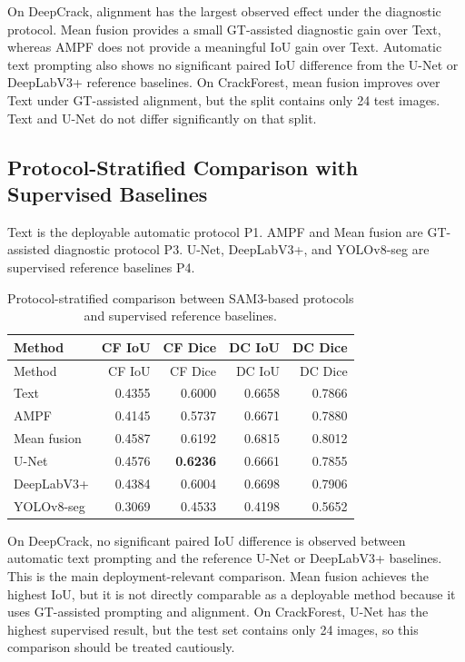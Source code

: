 \documentclass[applsci,article,submit,pdftex,moreauthors]{Definitions/mdpi}
\begin{document}
On DeepCrack, alignment has the largest observed effect under the
diagnostic protocol. Mean fusion provides a small GT-assisted diagnostic
gain over Text, whereas AMPF does not provide a meaningful IoU gain over
Text. Automatic text prompting also shows no significant paired IoU
difference from the U-Net or DeepLabV3+ reference baselines. On
CrackForest, mean fusion improves over Text under GT-assisted alignment,
but the split contains only 24 test images. Text and U-Net do not differ
significantly on that split.

\subsection{Protocol-Stratified Comparison with Supervised Baselines}

Text is the deployable automatic protocol P1. AMPF and Mean fusion are
GT-assisted diagnostic protocol P3. U-Net, DeepLabV3+, and YOLOv8-seg
are supervised reference baselines P4.

\begin{longtable}[]{@{}lrrrr@{}}
\caption{Protocol-stratified comparison between SAM3-based protocols and
supervised reference baselines.}\tabularnewline
\toprule\noalign{}
Method & CF IoU & CF Dice & DC IoU & DC Dice \\
\midrule\noalign{}
\endfirsthead
\toprule\noalign{}
Method & CF IoU & CF Dice & DC IoU & DC Dice \\
\midrule\noalign{}
\endhead
\bottomrule\noalign{}
\endlastfoot
Text & 0.4355 & 0.6000 & 0.6658 & 0.7866 \\
AMPF & 0.4145 & 0.5737 & 0.6671 & 0.7880 \\
Mean fusion & 0.4587 & 0.6192 & 0.6815 & 0.8012 \\
U-Net & 0.4576 & \textbf{0.6236} & 0.6661 & 0.7855 \\
DeepLabV3+ & 0.4384 & 0.6004 & 0.6698 & 0.7906 \\
YOLOv8-seg & 0.3069 & 0.4533 & 0.4198 & 0.5652 \\
\end{longtable}

On DeepCrack, no significant paired IoU difference is observed between
automatic text prompting and the reference U-Net or DeepLabV3+
baselines. This is the main deployment-relevant comparison. Mean fusion
achieves the highest IoU, but it is not directly comparable as a
deployable method because it uses GT-assisted prompting and alignment.
On CrackForest, U-Net has the highest supervised result, but the test
set contains only 24 images, so this comparison should be treated
cautiously.
\end{document}

